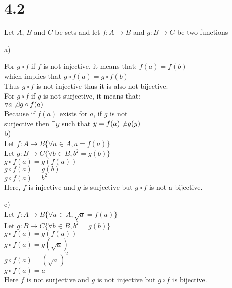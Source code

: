 \documentclass{article}
\begin{document}
    \section{4.2}

    Let $A$, $B$ and $C$ be sets and let $f : A \rightarrow B$ and $g : B \rightarrow C$ be two functions

    a)

    For $g\circ f$ if $f$ is not injective, it means that:
    $f(a) = f(b)$\\
    which implies that $g\circ f(a) = g\circ f(b)$\\
    Thus $g\circ f$ is not injective thus it is also not bijective.\\


    For $g\circ f$ if $g$ is not surjective, it means that:\\
    $\forall a \not \exists g\circ f(a)$\\
    Because if $f(a)$ exists for $a$, if $g$ is not\\ surjective then $\exists y$ such that $y = f(a) \not \exists g(y)$\\

    b)\\
    Let $f : A \rightarrow B \{\forall a \in A, a = f(a)\}$\\
    Let $g : B \rightarrow C \{\forall b \in B, b^2 = g(b)\}$\\
    $g\circ f(a) = g(f(a))$\\
    $g\circ f(a) = g(b)$\\
    $g\circ f(a) = b^2$\\

    Here, $f$ is injective and $g$ is surjective  but $g\circ f$ is not a bijective.

    c)\\
    Let $f : A \rightarrow B \{\forall a \in A, \sqrt{a} = f(a)\}$\\
    Let $g : B \rightarrow C \{\forall b \in B, b^2 = g(b)\}$\\
    $g\circ f(a) = g(f(a))$\\
    $g\circ f(a) = g(\sqrt{a})$\\
    $g\circ f(a) = (\sqrt{a})^2$\\
    $g\circ f(a) = a$\\

    Here $f$ is not surjective and $g$ is not injective but $g\circ f$ is bijective. 
\end{document}
